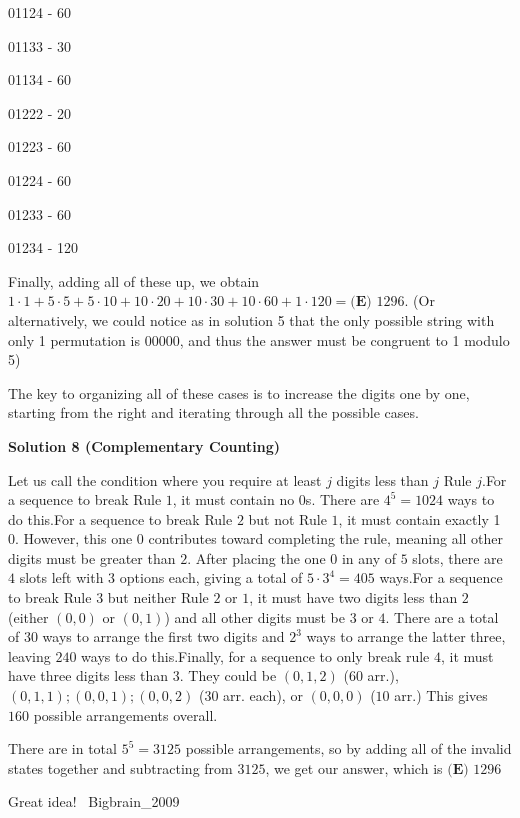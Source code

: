 \begin{enumerate}
 01124 - 60

 01133 - 30

 01134 - 60

 01222 - 20

 01223 - 60

 01224 - 60

 01233 - 60

 01234 - 120

 
Finally, adding all of these up, we obtain $1\cdot 1+5\cdot 5+5\cdot 10+10\cdot 20+10\cdot 30 + 10\cdot 60 + 1\cdot 120 = \boxed{\textbf{(E) }1296}$. (Or alternatively, we could notice as in solution 5 that the only possible string with only 1 permutation is 00000, and thus the answer must be congruent to 1 modulo 5)

 The key to organizing all of these cases is to increase the digits one by one, starting from the right and iterating through all the possible cases. 

 



\textbf{Solution 8 (Complementary Counting)}

Let us call the condition where you require at least $j$ digits less than $j$ Rule $j$.For a sequence to break Rule $1$, it must contain no $0$s. There are $4^5=1024$ ways to do this.For a sequence to break Rule $2$ but not Rule $1$, it must contain exactly 1 $0$. However, this one $0$ contributes toward completing the rule, meaning all other digits must be greater than $2$. After placing the one $0$ in any of $5$ slots, there are $4$ slots left with $3$ options each, giving a total of $5 \cdot 3^4 = 405$ ways.For a sequence to break Rule $3$ but neither Rule $2$ or $1$, it must have two digits less than $2$ (either $(0, 0)$ or $(0, 1)$) and all other digits must be $3$ or $4$. There are a total of $30$ ways to arrange the first two digits and $2^3$ ways to arrange the latter three, leaving $240$ ways to do this.Finally, for a sequence to only break rule $4$, it must have three digits less than $3$. They could be $(0, 1, 2)$ (60 arr.), $(0, 1, 1); (0, 0, 1); (0, 0, 2)$ ($30$ arr. each), or $(0, 0, 0)$ ($10$ arr.) This gives $160$ possible arrangements overall.

 There are in total $5^5=3125$ possible arrangements, so by adding all of the invalid states together and subtracting from $3125$, we get our answer, which is $\boxed{\textbf{(E) }1296}$

 Great idea! ~Bigbrain\_2009

 




\end{enumerate}
